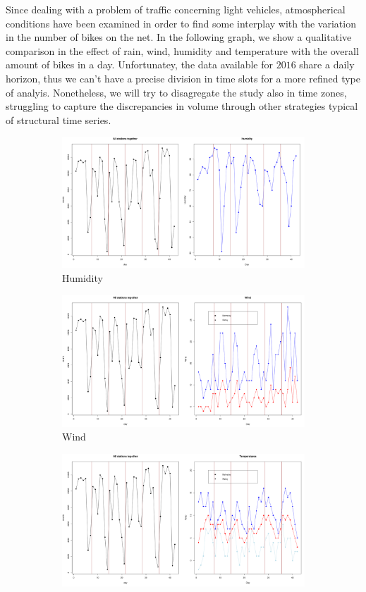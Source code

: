 \documentclass[11pt,twoside]{report}
\begin{document}
Since dealing with a problem of traffic concerning light vehicles, atmospherical conditions have been examined in order to find some interplay with the variation in the number of bikes on the net. In the following graph, we show a qualitative comparison in the effect of rain, wind, humidity and temperature with the overall amount of bikes in a day. Unfortunatey, the data available for $ 2016 $ share a daily horizon, thus we can't have a precise division in time slots for a more refined type of analyis. Nonetheless, we will try to disagregate the study also in time zones, struggling to capture the discrepancies in volume through other strategies typical of structural time series.

\begin{figure}[H]
	\begin{subfigure}[H]{1\linewidth}
		\centering
		\includegraphics[width=110 mm]{pictures/humidity.png}
		\caption{Humidity}
		\label{fig:humidity}
	\end{subfigure}
	\vfill
	\begin{subfigure}[H]{1\linewidth}
		\centering
		\includegraphics[width=110 mm]{pictures/wind.png}
		\caption{Wind}
		\label{fig:wind}
	\end{subfigure}
	\vfill
	\begin{subfigure}[H]{1\linewidth}
		\centering
		\includegraphics[width=110 mm]{pictures/temperatures.png}

\end{subfigure}
\end{figure}
\end{document}
